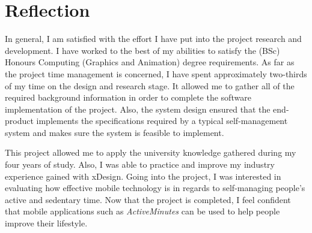\section{Reflection}
In general, I am satisfied with the effort I have put into the project research and development. I have worked to the best of my abilities to satisfy the (BSc) Honours Computing (Graphics and Animation) degree requirements. As far as the project time management is concerned, I have spent approximately two-thirds of my time on the design and research stage. It allowed me to gather all of the required background information in order to complete the software implementation of the project. Also, the system design ensured that the end-product implements the specifications required by a typical self-management system and makes sure the system is feasible to implement.

This project allowed me to apply the university knowledge gathered during my four years of study. Also, I was able to practice and improve my industry experience gained with xDesign. Going into the project, I was interested in evaluating how effective mobile technology is in regards to self-managing people's active and sedentary time. Now that the project is completed, I feel confident that mobile applications such as \textit{ActiveMinutes} can be used to help people improve their lifestyle.
